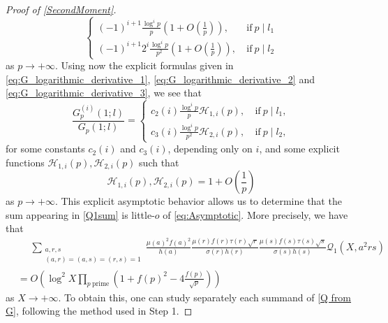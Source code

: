 \documentclass[10pt,a4paper]{amsart}
\def\CalQ{{\mathcal{Q}}}
\theoremstyle{plain}
\theoremstyle{definition}
\theoremstyle{remark}
\begin{document}
\begin{proof}[Proof of \cref{SecondMoment}]
\[\begin{cases}
    (-1)^{i+1} \frac{\log^ip}{p} \left( 1 + O(\frac{1}{p}) \right), \ &\text{if} \ p \mid l_1 \\
    (-1)^{i+1} 2^i \frac{\log^ip}{p^2} \left( 1 + O(\frac{1}{p}) \right), \ &\text{if} \ p \mid l_2
\end{cases}
\]
as $p \to +\infty$. Using now the explicit formulas given in \eqref{eq:G_logarithmic_derivative_1}, \eqref{eq:G_logarithmic_derivative_2} and \eqref{eq:G_logarithmic_derivative_3}, we see that
\begin{equation} \label{eq:Gp_asymptotics_main}
    \frac{G_p^{(i)}(1;l)}{G_p(1;l)} = \begin{cases}
        c_2(i) \frac{\log^ip}{p} \mathcal{H}_{1,i}(p), \ &\text{if} \ p \mid l_1, \\
        c_3(i) \frac{\log^ip}{p^2} \mathcal{H}_{2,i}(p), \ &\text{if} \ p \mid l_2,
    \end{cases}
\end{equation}
for some constants $c_2(i)$ and $c_3(i)$, depending only on $i$, and some explicit functions $\mathcal{H}_{1,i}(p), \mathcal{H}_{2,i}(p)$ such that \[\mathcal{H}_{1,i}(p), \mathcal{H}_{2,i}(p) = 1 + O\left( \frac{1}{p} \right)\] 
as $p \to +\infty$. This explicit asymptotic behavior allows us to determine that the sum appearing in \eqref{Q1sum} is little-$o$ of \eqref{eq:Asymptotic}. More precisely, we have that
\begin{equation} \label{eq:Q1_estimate}
    \begin{aligned}
        &\phantom{=} \sum_{\substack{a,r,s \\(a,r)=(a,s)=(r,s)=1}}
\frac{\mu(a)^2f(a)^2}{h(a)}\frac{\mu(r)f(r)\tau(r)\sqrt{r}}{\sigma(r)h(r)}\frac{\mu(s)f(s)\tau(s)\sqrt{s}}{\sigma(s)h(s)}\CalQ_1(X,a^2rs) \\ &= 
O\left(\log^{2} X \prod_{p \ \text{prime}}\left(1+f(p)^2-4\frac{f(p)}{\sqrt{p}}\right)\right)
    \end{aligned}
\end{equation}
as $X \to +\infty$.
To obtain this, one can study separately each summand of \eqref{Q from G}, following the method used in Step 1.


\end{proof}
\end{document}
